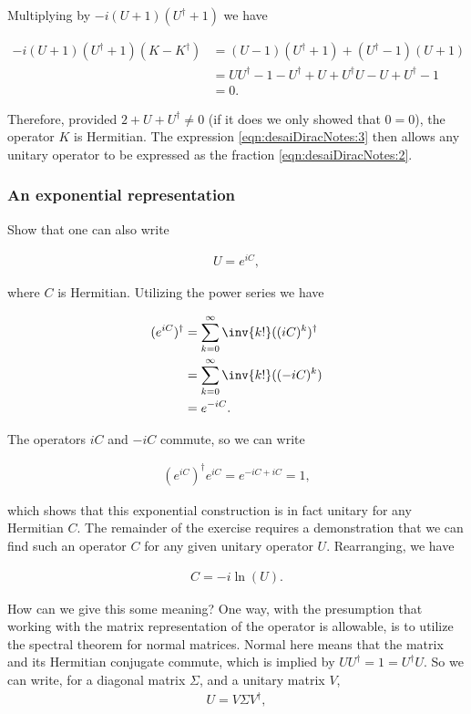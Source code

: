 Multiplying by $-i(U+1)(U^\dagger+1)$ we have

\begin{align*}
-i(U+1)(U^\dagger+1)(K - K^\dagger) 
&= ( U - 1 )(U^\dagger + 1) + ( U^\dagger - 1 )(U + 1) \\
&= U U^\dagger - 1 - U^\dagger + U     + U^\dagger U - U + U^\dagger - 1 \\
&= 0.
\end{align*}

Therefore, provided $2 + U + U^\dagger \ne 0$ (if it does we only showed that $0 = 0$), the operator $K$ is Hermitian.  The expression \ref{eqn:desaiDiracNotes:3} then allows any unitary operator to be expressed as the fraction \ref{eqn:desaiDiracNotes:2}.

\subsubsection{An exponential representation}

Show that one can also write

\begin{align*}
U = e^{i C},
\end{align*}

where $C$ is Hermitian.  Utilizing the power series we have

\begin{align*}
(e^{iC})^\dagger
&= 
\sum_{k=0}^\infty \inv{k!} ((iC)^k)^\dagger \\
&= 
\sum_{k=0}^\infty \inv{k!} ((-iC)^k) \\
&= 
e^{-iC}.
\end{align*}

The operators $i C$ and $-i C$ commute, so we can write

\begin{align*}
(e^{iC})^\dagger e^{iC} = e^{ -iC + iC } = 1,
\end{align*}

which shows that this exponential construction is in fact unitary for any Hermitian $C$.  The remainder of the exercise requires a demonstration that we can find such an operator $C$ for any given unitary operator $U$.  Rearranging, we have

\begin{align}\label{eqn:desaiDiracNotes:10}
C = -i \ln ( U ).
\end{align}

How can we give this some meaning?  One way, with the presumption that working with the matrix representation of the operator is allowable, is to utilize the spectral theorem for normal matrices.  Normal here means that the matrix and its Hermitian conjugate commute, which is implied by $U U^\dagger = 1 = U^\dagger U$.  So we can write, for a diagonal matrix $\Sigma$, and a unitary matrix $V$, 
\begin{align*}
U = V \Sigma V^\dagger,
\end{align*}

